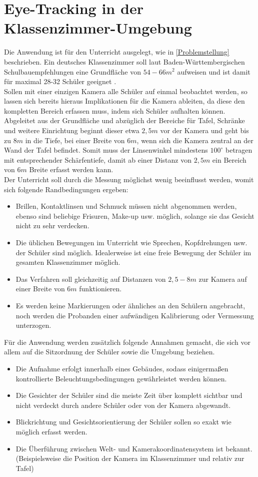 \section{Eye-Tracking in der Klassenzimmer-Umgebung}
Die Anwendung ist für den Unterricht ausgelegt, wie in \autoref{Problemstellung} beschrieben. Ein deutsches Klassenzimmer soll laut Baden-Württembergischen Schulbauempfehlungen eine Grundfläche von $54-66m^2$ aufweisen und ist damit für maximal 28-32 Schüler geeignet \cite{bauordung}.\\
Sollen mit einer einzigen Kamera alle Schüler auf einmal beobachtet werden, so lassen sich bereits hieraus Implikationen für die Kamera ableiten, da diese den kompletten Bereich erfassen muss, indem sich Schüler aufhalten können. Abgeleitet aus der Grundfläche und abzüglich der Bereiche für Tafel, Schränke und weitere Einrichtung beginnt dieser etwa $2,5m$ vor der Kamera und geht bis zu $8m$ in die Tiefe, bei einer Breite von $6m$, wenn sich die Kamera zentral an der Wand der Tafel befindet. Somit muss der Linsenwinkel mindestens $100^\circ$ betragen mit entsprechender Schärfentiefe, damit ab einer Distanz von $2,5m$ ein Bereich von $6m$ Breite erfasst werden kann.\\
Der Unterricht soll durch die Messung möglichst wenig beeinflusst werden, womit sich folgende Randbedingungen ergeben:
\begin{itemize}
\item Brillen, Kontaktlinsen und Schmuck müssen nicht abgenommen werden, ebenso sind beliebige Frisuren, Make-up usw. möglich, solange sie das Gesicht nicht zu sehr verdecken.
\item Die üblichen Bewegungen im Unterricht wie Sprechen, Kopfdrehungen usw. der Schüler sind möglich. Idealerweise ist eine freie Bewegung der Schüler im gesamten Klassenzimmer möglich.
\item Das Verfahren soll gleichzeitig auf Distanzen von $2,5 - 8m$ zur Kamera auf einer Breite von $6m$ funktionieren.
\item Es werden keine Markierungen oder ähnliches an den Schülern angebracht, noch werden die Probanden einer aufwändigen Kalibrierung oder Vermessung unterzogen.
\end{itemize}
Für die Anwendung werden zusätzlich folgende Annahmen gemacht, die sich vor allem auf die Sitzordnung der Schüler sowie die Umgebung beziehen.
\begin{itemize}
\item Die Aufnahme erfolgt innerhalb eines Gebäudes, sodass einigermaßen kontrollierte Beleuchtungsbedingungen gewährleistet werden können.
\item Die Gesichter der Schüler sind die meiste Zeit über komplett sichtbar und nicht verdeckt durch andere Schüler oder von der Kamera abgewandt.
\item Blickrichtung und Gesichtsorientierung der Schüler sollen so exakt wie möglich erfasst werden.
\item Die Überführung zwischen Welt- und Kamerakoordinatensystem ist bekannt.\\
(Beispielsweise die Position der Kamera im Klassenzimmer und relativ zur Tafel)
\end{itemize}